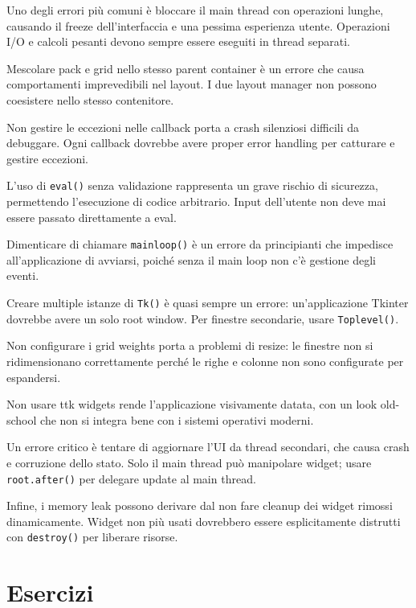 \begin{tcolorbox}[title=Errori Comuni]
Uno degli errori più comuni è bloccare il main thread con operazioni lunghe, causando il freeze dell'interfaccia e una pessima esperienza utente. Operazioni I/O e calcoli pesanti devono sempre essere eseguiti in thread separati.

Mescolare pack e grid nello stesso parent container è un errore che causa comportamenti imprevedibili nel layout. I due layout manager non possono coesistere nello stesso contenitore.

Non gestire le eccezioni nelle callback porta a crash silenziosi difficili da debuggare. Ogni callback dovrebbe avere proper error handling per catturare e gestire eccezioni.

L'uso di \verb|eval()| senza validazione rappresenta un grave rischio di sicurezza, permettendo l'esecuzione di codice arbitrario. Input dell'utente non deve mai essere passato direttamente a eval.

Dimenticare di chiamare \verb|mainloop()| è un errore da principianti che impedisce all'applicazione di avviarsi, poiché senza il main loop non c'è gestione degli eventi.

Creare multiple istanze di \verb|Tk()| è quasi sempre un errore: un'applicazione Tkinter dovrebbe avere un solo root window. Per finestre secondarie, usare \verb|Toplevel()|.

Non configurare i grid weights porta a problemi di resize: le finestre non si ridimensionano correttamente perché le righe e colonne non sono configurate per espandersi.

Non usare ttk widgets rende l'applicazione visivamente datata, con un look old-school che non si integra bene con i sistemi operativi moderni.

Un errore critico è tentare di aggiornare l'UI da thread secondari, che causa crash e corruzione dello stato. Solo il main thread può manipolare widget; usare \verb|root.after()| per delegare update al main thread.

Infine, i memory leak possono derivare dal non fare cleanup dei widget rimossi dinamicamente. Widget non più usati dovrebbero essere esplicitamente distrutti con \verb|destroy()| per liberare risorse.
\end{tcolorbox}

\section{Esercizi}

